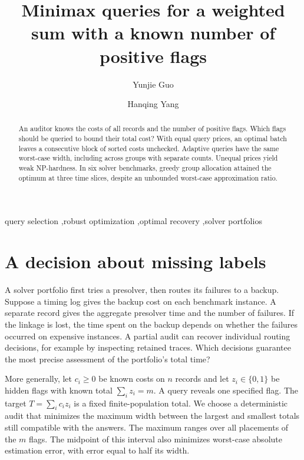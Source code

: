 \documentclass[final,5p,times,twocolumn]{elsarticle}
\begin{document}
\begin{frontmatter}
\title{Minimax queries for a weighted sum with a known number of positive flags}
\author{Yunjie Guo}
\author{Hanqing Yang}
\address{Independent Researcher, Suzhou, China}
\begin{abstract}
An auditor knows the costs of all records and the number of positive flags. Which flags should be queried to bound their total cost? With equal query prices, an optimal batch leaves a consecutive block of sorted costs unchecked. Adaptive queries have the same worst-case width, including across groups with separate counts. Unequal prices yield weak NP-hardness. In six solver benchmarks, greedy group allocation attained the optimum at three time slices, despite an unbounded worst-case approximation ratio.
\end{abstract}
\begin{keyword}
query selection \sep robust optimization \sep optimal recovery \sep solver portfolios
\end{keyword}
\end{frontmatter}

\section{A decision about missing labels}
A solver portfolio first tries a presolver, then routes its failures to a backup. Suppose a timing log gives the backup cost on each benchmark instance. A separate record gives the aggregate presolver time and the number of failures. If the linkage is lost, the time spent on the backup depends on whether the failures occurred on expensive instances. A partial audit can recover individual routing decisions, for example by inspecting retained traces. Which decisions guarantee the most precise assessment of the portfolio's total time?

More generally, let $c_i\geq 0$ be known costs on $n$ records and let $z_i\in\{0,1\}$ be hidden flags with known total $\sum_i z_i=m$. A query reveals one specified flag. The target $T=\sum_i c_i z_i$ is a fixed finite-population total. We choose a deterministic audit that minimizes the maximum width between the largest and smallest totals still compatible with the answers. The maximum ranges over all placements of the $m$ flags. The midpoint of this interval also minimizes worst-case absolute estimation error, with error equal to half its width.
\end{document}
